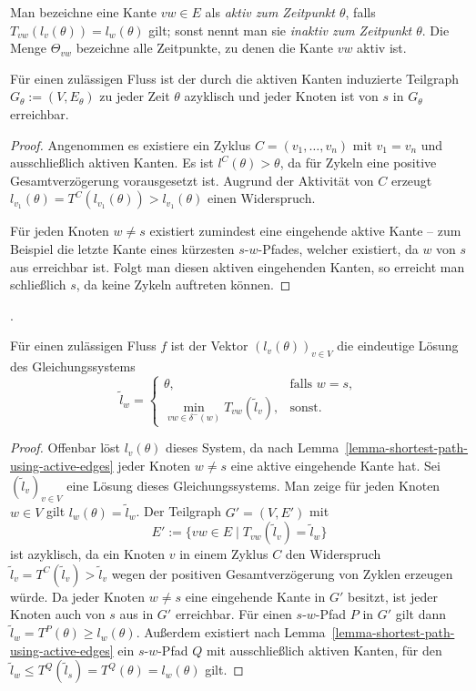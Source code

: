 \begin{definition}
	Man bezeichne eine Kante $vw\in E$ als \emph{aktiv zum Zeitpunkt $\theta$}, falls $T_{vw}(l_v(\theta)) = l_w(\theta)$ gilt; sonst nennt man sie \emph{inaktiv zum Zeitpunkt $\theta$}.
	Die Menge $\Theta_{vw}$ bezeichne alle Zeitpunkte, zu denen die Kante $vw$ aktiv ist.
\end{definition}

\begin{lemma}\label{lemma-shortest-path-using-active-edges}
	Für einen zulässigen Fluss ist der durch die aktiven Kanten induzierte Teilgraph $G_\theta:=(V, E_\theta)$ zu jeder Zeit $\theta$ azyklisch und jeder Knoten ist von $s$ in $G_\theta$ erreichbar.
\end{lemma}
\begin{proof}
	Angenommen es existiere ein Zyklus $C=(v_1, \dots, v_n)$ mit $v_1=v_n$ und ausschließlich aktiven Kanten.
	Es ist $l^C(\theta) > \theta$, da für Zykeln eine positive Gesamtverzögerung vorausgesetzt ist.
	Augrund der Aktivität von $C$ erzeugt $l_{v_1}(\theta) = T^C(l_{v_1}(\theta)) > l_{v_1}(\theta)$ einen Widerspruch.
	
	Für jeden Knoten $w\neq s$ existiert zumindest eine eingehende aktive Kante -- zum Beispiel die letzte Kante eines kürzesten $s$-$w$-Pfades, welcher existiert, da $w$ von $s$ aus erreichbar ist.
	Folgt man diesen aktiven eingehenden Kanten, so erreicht man schließlich $s$, da keine Zykeln auftreten können.
\end{proof}

.

\begin{proposition}\label{prop-arrival-times-vector}
	Für einen zulässigen Fluss $f$ ist der Vektor $(l_v(\theta))_{v\in V}$ die eindeutige Lösung des Gleichungssystems
	$$ \tilde{l}_w = \begin{cases}
	\theta, & \text{falls } w=s, \\
	\min\limits_{vw\in \delta^-(w)} T_{vw}(\tilde{l}_v), & \text{sonst}.
	\end{cases}$$
\end{proposition}
\begin{proof}
	Offenbar löst $l_v(\theta)$ dieses System, da nach Lemma~\ref{lemma-shortest-path-using-active-edges} jeder Knoten $w\neq s$ eine aktive eingehende Kante hat.
	Sei $(\tilde{l}_v)_{v\in V}$ eine Lösung dieses Gleichungssystems.
	Man zeige für jeden Knoten $w\in V$ gilt $l_w(\theta) = \tilde{l}_w$.
	Der Teilgraph $G'=(V, E')$ mit
	$$E' := \{ vw \in E \mid T_{vw}(\tilde{l}_v ) = \tilde{l}_w \}$$
	ist azyklisch,
	da ein Knoten $v$ in einem Zyklus $C$ den Widerspruch $\tilde{l}_v = T^C(\tilde{l}_v) > \tilde{l}_v$ wegen der positiven Gesamtverzögerung von Zyklen erzeugen würde.
	Da jeder Knoten $w\neq s$ eine eingehende Kante in $G'$ besitzt, ist jeder Knoten auch von $s$ aus in $G'$ erreichbar.
	Für einen $s$-$w$-Pfad $P$ in $G'$ gilt dann $\tilde{l}_w = T^P(\theta) \geq l_w(\theta)$.
	Außerdem existiert nach Lemma~\ref{lemma-shortest-path-using-active-edges} ein $s$-$w$-Pfad $Q$ mit ausschließlich aktiven Kanten, für den $\tilde{l}_w \leq T^Q(\tilde{l}_s) = T^Q(\theta) = l_w(\theta)$ gilt.
\end{proof}
